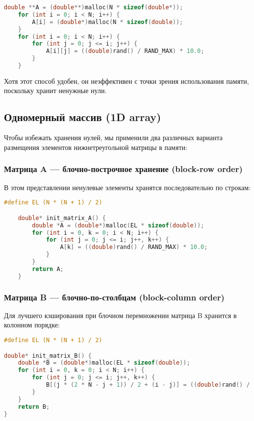 \documentclass[14pt, russian]{matmex-diploma-custom}
\begin{document}
\begin{lstlisting}[language=C, caption={Инициализация нижнетреугольной матрицы в 2D массиве}]
    double **A = (double**)malloc(N * sizeof(double*));
    for (int i = 0; i < N; i++) {
        A[i] = (double*)malloc(N * sizeof(double));
    }
    for (int i = 0; i < N; i++) {
        for (int j = 0; j <= i; j++) {
            A[i][j] = ((double)rand() / RAND_MAX) * 10.0;
        }
    }
\end{lstlisting}

Хотя этот способ удобен, он неэффективен с точки зрения использования памяти, поскольку хранит ненужные нули.

\subsection{Одномерный массив (1D array)}

Чтобы избежать хранения нулей, мы применили два различных варианта размещения элементов нижнетреугольной матрицы в памяти:

\subsubsection{Матрица A — блочно-построчное хранение (block-row order)}

В этом представлении ненулевые элементы хранятся последовательно по строкам:

{\footnotesize
\begin{lstlisting}[language=C, caption={Инициализация матрицы A в 1D массиве}]
    #define EL (N * (N + 1) / 2)

    double* init_matrix_A() {
        double *A = (double*)malloc(EL * sizeof(double));
        for (int i = 0, k = 0; i < N; i++) {
            for (int j = 0; j <= i; j++, k++) {
                A[k] = ((double)rand() / RAND_MAX) * 10.0;
            }
        }
        return A;
    }
\end{lstlisting}
}

\subsubsection{Матрица B — блочно-по-столбцам (block-column order)}

Для лучшего кэширования при блочном перемножении матрица B хранится в колонном порядке:

{\footnotesize
\begin{lstlisting}[language=C, caption={Инициализация матрицы B в 1D массиве}]
#define EL (N * (N + 1) / 2)

double* init_matrix_B() {
    double *B = (double*)malloc(EL * sizeof(double));
    for (int i = 0, k = 0; i < N; i++) {
        for (int j = 0; j <= i; j++, k++) {
            B[(j * (2 * N - j + 1)) / 2 + (i - j)] = ((double)rand() / RAND_MAX) * 10.0;
        }
    }
    return B;
}
\end{lstlisting}
}
\end{document}
